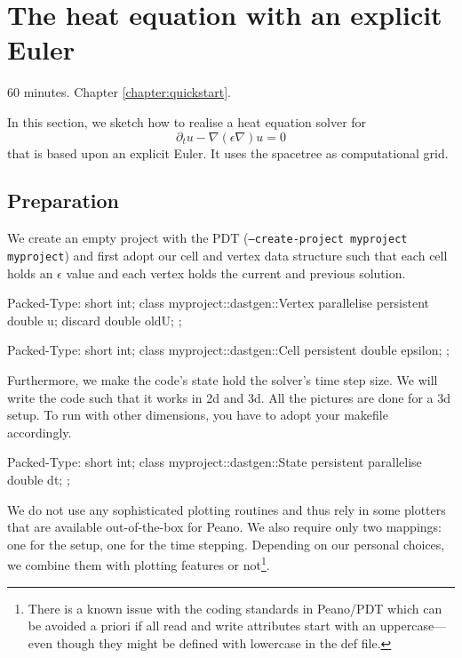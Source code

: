 \section{The heat equation with an explicit Euler}
  \label{section:applications:heat-equation}

\chapterDescription
  {
    60 minutes.
  }
  {
    Chapter \ref{chapter:quickstart}.
  }

In this section, we sketch how to realise a heat equation solver for
\[
  \partial _t u - \nabla (\epsilon \nabla) u = 0
\]
that is based
upon an explicit Euler.
It uses the spacetree as computational grid.


\subsection{Preparation}

We create an empty project with the PDT (\texttt{--create-project myproject
myproject}) and first adopt our cell and vertex data structure such that each
cell holds an $\epsilon$ value and each vertex holds the current and previous
solution.

\begin{code}
Packed-Type: short int;
class myproject::dastgen::Vertex {
  parallelise persistent double  u;
  discard                double  oldU;
};
\end{code}


\begin{code}
Packed-Type: short int;
class myproject::dastgen::Cell {
  persistent double epsilon;
};
\end{code}


\noindent
Furthermore, we make the code's state hold the solver's time step size. We will
write the code such that it works in 2d and 3d. All the pictures are done for a
3d setup. To run with other dimensions, you have to adopt your makefile
accordingly.


\begin{code}
Packed-Type: short int;
class myproject::dastgen::State { 
  persistent parallelise double dt;
};
\end{code}


\noindent
We do not use any sophisticated plotting routines and thus rely in some plotters
that are available out-of-the-box for Peano.
We also require only two mappings: one for the setup, one for the time stepping. 
Depending on our personal choices, we combine them with plotting features or
not\footnote{There is a known issue with the coding standards in Peano/PDT
which can be avoided a priori if all read and write attributes start with an
uppercase---even though they might be defined with lowercase in the def file.}.

